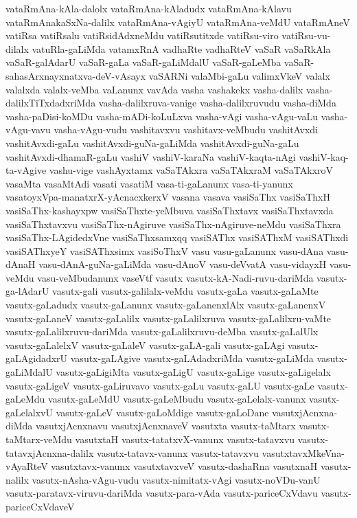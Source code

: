 {vataRmAna-kAla-dalolx
vataRmAna-kAladudx
vataRmAna-kAlavu
vataRmAnakaSxNa-dalilx
vataRmAna-vAgiyU
vataRmAna-veMdU
vataRmAneV
vatiRsa
vatiRsalu
vatiRsidAdxneMdu
vatiRsutitxde
vatiRsu-viro
vatiRsu-vu-dilalx
vatuRla-gaLiMda
vatamxRnA
vadhaRte
vadhaRteV
vaSaR
vaSaRkAla
vaSaR-galAdarU
vaSaR-gaLa
vaSaR-gaLiMdalU
vaSaR-gaLeMba
vaSaR-sahasArxnayxnatxva-deV-vAsayx
vaSARNi
valaMbi-gaLu
valimxVkeV
valalx
valalxda
valalx-veMba
vaLanunx
vavAda
vasha
vashakekx
vasha-dalilx
vasha-dalilxTiTxdadxriMda
vasha-dalilxruva-vanige
vasha-dalilxruvudu
vasha-diMda
vasha-paDisi-koMDu
vasha-mADi-koLuLxva
vasha-vAgi
vasha-vAgu-vaLu
vasha-vAgu-vavu
vasha-vAgu-vudu
vashitavxvu
vashitavx-veMbudu
vashitAvxdi
vashitAvxdi-gaLu
vashitAvxdi-guNa-gaLiMda
vashitAvxdi-guNa-gaLu
vashitAvxdi-dhamaR-gaLu
vashiV
vashiV-karaNa
vashiV-kaqta-nAgi
vashiV-kaq-ta-vAgive
vashu-vige
vashAyxtamx
vaSaTAkxra
vaSaTAkxraM
vaSaTAkxroV
vasaMta
vasaMtAdi
vasati
vasatiM
vasa-ti-gaLanunx
vasa-ti-yanunx
vasatoyxVpa-manatxrX-yAcnacxkerxV
vasana
vasava
vasiSaThx
vasiSaThxH
vasiSaThx-kashayxpw
vasiSaThxte-yeMbuva
vasiSaThxtavx
vasiSaThxtavxda
vasiSaThxtavxvu
vasiSaThx-nAgiruve
vasiSaThx-nAgiruve-neMdu
vasiSaThxra
vasiSaThx-LAgidedxVne
vasiSaThxsamxqq
vasiSAThx
vasiSAThxM
vasiSAThxdi
vasiSAThxyeY
vasiSAThxsimx
vasiSoThxV
vasu
vasu-gaLanunx
vasu-dAna
vasu-dAnaH
vasu-dAnA-guNa-gaLiMda
vasu-dAnoV
vasu-deVvatA
vasu-vidayxH
vasu-veMdu
vasu-veMbudanunx
vaseVtf
vasutx
vasutx-kA-Nadi-ruvu-dariMda
vasutx-ga-lAdarU
vasutx-gali
vasutx-galilalx-veMdu
vasutx-gaLa
vasutx-gaLaMte
vasutx-gaLadudx
vasutx-gaLanunx
vasutx-gaLanenxlAlx
vasutx-gaLanenxV
vasutx-gaLaneV
vasutx-gaLalilx
vasutx-gaLalilxruva
vasutx-gaLalilxru-vaMte
vasutx-gaLalilxruvu-dariMda
vasutx-gaLalilxruvu-deMba
vasutx-gaLalUlx
vasutx-gaLalelxV
vasutx-gaLaleV
vasutx-gaLA-gali
vasutx-gaLAgi
vasutx-gaLAgidadxrU
vasutx-gaLAgive
vasutx-gaLAdadxriMda
vasutx-gaLiMda
vasutx-gaLiMdalU
vasutx-gaLigiMta
vasutx-gaLigU
vasutx-gaLige
vasutx-gaLigelalx
vasutx-gaLigeV
vasutx-gaLiruvavo
vasutx-gaLu
vasutx-gaLU
vasutx-gaLe
vasutx-gaLeMdu
vasutx-gaLeMdU
vasutx-gaLeMbudu
vasutx-gaLelalx-vanunx
vasutx-gaLelalxvU
vasutx-gaLeV
vasutx-gaLoMdige
vasutx-gaLoDane
vasutxjAcnxna-diMda
vasutxjAcnxnavu
vasutxjAcnxnaveV
vasutxta
vasutx-taMtarx
vasutx-taMtarx-veMdu
vasutxtaH
vasutx-tatatxvX-vanunx
vasutx-tatavxvu
vasutx-tatavxjAcnxna-dalilx
vasutx-tatavx-vanunx
vasutx-tatavxvu
vasutxtavxMkeVna-vAyaRteV
vasutxtavx-vanunx
vasutxtavxveV
vasutx-dashaRna
vasutxnaH
vasutx-nalilx
vasutx-nAsha-vAgu-vudu
vasutx-nimitatx-vAgi
vasutx-noVDu-vanU
vasutx-paratavx-viruvu-dariMda
vasutx-para-vAda
vasutx-pariceCxVdavu
vasutx-pariceCxVdaveV
}
